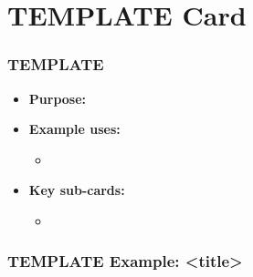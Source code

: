 \section{TEMPLATE Card}

\begin{frame}\frametitle{TEMPLATE}

\begin{itemize}
\item[] \textbf{Purpose:}
\item[] \textbf{Example uses:}
\begin{itemize}
  \item
\end{itemize}
\item[] \textbf{Key sub-cards:}
\begin{itemize}
  \item[] \verb||
\end{itemize}
\end{itemize}

\end{frame}

\begin{frame}[fragile]\frametitle{TEMPLATE Example: <title>}

\begin{semiverbatim}
\end{semiverbatim}

\end{frame}
